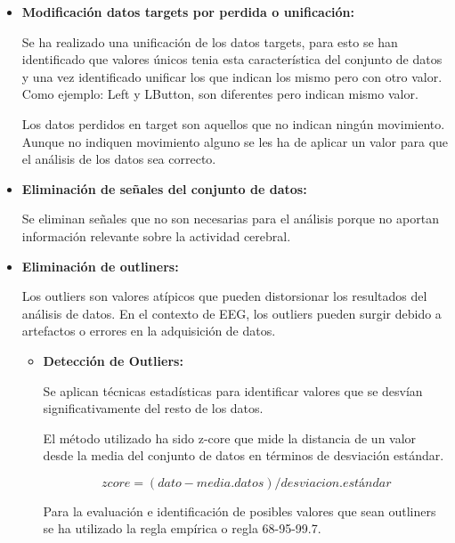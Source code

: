 \begin{itemize}

	\item
	\textbf{Modificación datos targets por perdida o unificación:}	
	
	
	Se ha realizado una unificación de los datos targets, para esto se han identificado que valores únicos tenia esta característica del conjunto de datos y una vez identificado unificar los que indican los mismo pero con otro valor. Como ejemplo: Left y LButton, son diferentes pero indican mismo valor.



	
	Los datos perdidos en target son aquellos que no indican ningún movimiento. Aunque no indiquen movimiento alguno se les ha de aplicar un valor para que  el análisis de los datos sea correcto. 
	



	\item
	\textbf{Eliminación de señales del conjunto de datos:}
	
	Se eliminan señales que no son necesarias para el análisis porque no aportan información relevante sobre la actividad cerebral. 

	
	\item
	\textbf{Eliminación de outliners:}
	
	Los outliers son valores atípicos que pueden distorsionar los resultados del análisis de datos. En el contexto de EEG, los outliers pueden surgir debido a artefactos o errores en la adquisición de datos.
	\begin{itemize}
	
	\item
	\textbf{Detección de Outliers:}
	
	Se aplican técnicas estadísticas para identificar valores que se desvían significativamente del resto de los datos. 
	
	
	El método utilizado ha sido z-core que mide la distancia de un valor desde la media del conjunto de datos en términos de desviación estándar.
	
	\begin{equation*}
	zcore = (dato - media.datos) / desviacion.estándar
	\end{equation*}

	
	Para la evaluación e identificación de posibles valores que sean outliners se ha utilizado la regla empírica o regla	68-95-99.7.~\cite{outliners:empirica}


\end{itemize}
\end{itemize}
